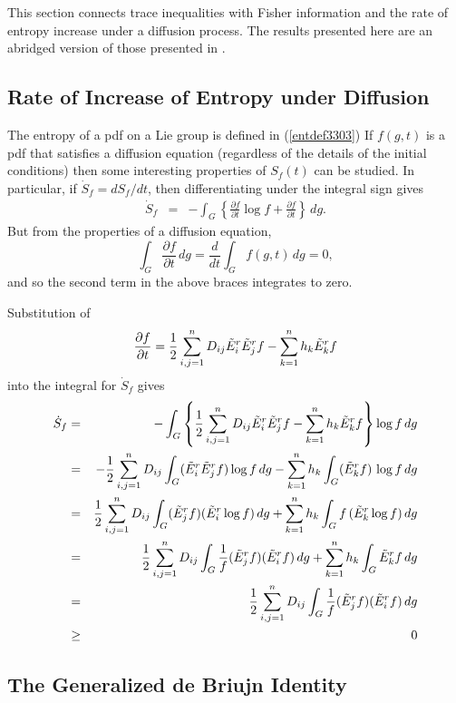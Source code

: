 \documentclass{svmult}
\def\half{ {1\over 2} }
\newcommand{\bea}{\begin{eqnarray*}}
\newcommand{\eea}{\end{eqnarray*}}
\begin{document}
This section connects trace inequalities with Fisher information and the rate of entropy increase under a diffusion process. The results presented here are an abridged version of those presented
in \cite{vol2}.

\subsection{Rate of Increase of Entropy under Diffusion}

The entropy of a pdf on a Lie group is defined in (\ref{entdef3303})
If $f(g,t)$ is a pdf that satisfies a diffusion equation (regardless of the details of the initial conditions) then some interesting properties of $S_f(t)$ can be studied. In particular, if $\dot{S}_{f} = dS_f/dt$, then differentiating
under the integral sign gives
\bea
\dot{S}_{f} &=& - \int_G \left\{\frac{\partial f}{\partial t} \log f + \frac{\partial f}{\partial t}
\right\} \,dg .
\eea
But from the properties of a diffusion equation,
$$ \int_{G} \frac{\partial f}{\partial t} \,dg =
\frac{d}{dt} \int_G f(g,t) \,dg = 0, $$
and so the second term in the above braces integrates to zero.

Substitution of
$$ \frac{\partial f}{\partial t} = \half \sum_{i,j=1}^{n} D_{ij} \tilde{E}_i^r \tilde{E}_j^r f
- \sum_{k=1}^{n} h_k \tilde{E}_k^r f $$
into the integral for $\dot{S}_{f}$ gives
\bea
\dot{S}_{f} &=& - \int_G \left\{
\half \sum_{i,j=1}^{n} D_{ij} \tilde{E}_i^r \tilde{E}_j^r f
- \sum_{k=1}^{n} h_k \tilde{E}_k^r f
\right\} \log f \, dg \\
&=& - \half \sum_{i,j=1}^{n} D_{ij} \int_G (\tilde{E}_i^r \tilde{E}_j^r f) \log f \, dg
- \sum_{k=1}^{n}  h_k \int_G (\tilde{E}_k^r f) \, \log f \, dg \\
&=& \half \sum_{i,j=1}^{n} D_{ij} \int_G  (\tilde{E}_j^r f) (\tilde{E}_i^r\log f)\, dg
+ \sum_{k=1}^{n} h_k \int_G f \, (\tilde{E}_k^r \log f) \, dg \\
&=& \half \sum_{i,j=1}^{n} D_{ij} \int_G  \frac{1}{f} (\tilde{E}_j^r f) (\tilde{E}_i^r f)\, dg + \sum_{k=1}^{n} h_k \int_G \tilde{E}_k^r f \, dg \\
&=& \half \sum_{i,j=1}^{n} D_{ij} \int_G  \frac{1}{f} (\tilde{E}_j^r f) (\tilde{E}_i^r f)\, dg \\
&\geq& 0
\eea


\subsection{The Generalized de Briujn Identity}
\end{document}
